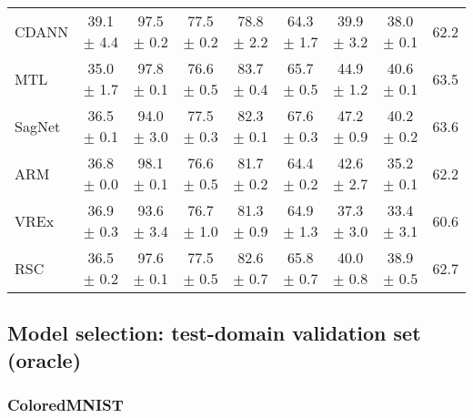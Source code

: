 \documentclass{article}
\begin{document}
\begin{center}
{\begin{tabular}{lcccccccc}
CDANN                     & 39.1 $\pm$ 4.4            & 97.5 $\pm$ 0.2            & 77.5 $\pm$ 0.2            & 78.8 $\pm$ 2.2            & 64.3 $\pm$ 1.7            & 39.9 $\pm$ 3.2            & 38.0 $\pm$ 0.1            & 62.2                      \\
MTL                       & 35.0 $\pm$ 1.7            & 97.8 $\pm$ 0.1            & 76.6 $\pm$ 0.5            & 83.7 $\pm$ 0.4            & 65.7 $\pm$ 0.5            & 44.9 $\pm$ 1.2            & 40.6 $\pm$ 0.1            & 63.5                      \\
SagNet                    & 36.5 $\pm$ 0.1            & 94.0 $\pm$ 3.0            & 77.5 $\pm$ 0.3            & 82.3 $\pm$ 0.1            & 67.6 $\pm$ 0.3            & 47.2 $\pm$ 0.9            & 40.2 $\pm$ 0.2            & 63.6                      \\
ARM                       & 36.8 $\pm$ 0.0            & 98.1 $\pm$ 0.1            & 76.6 $\pm$ 0.5            & 81.7 $\pm$ 0.2            & 64.4 $\pm$ 0.2            & 42.6 $\pm$ 2.7            & 35.2 $\pm$ 0.1            & 62.2                      \\
VREx                      & 36.9 $\pm$ 0.3            & 93.6 $\pm$ 3.4            & 76.7 $\pm$ 1.0            & 81.3 $\pm$ 0.9            & 64.9 $\pm$ 1.3            & 37.3 $\pm$ 3.0            & 33.4 $\pm$ 3.1            & 60.6                      \\
RSC                       & 36.5 $\pm$ 0.2            & 97.6 $\pm$ 0.1            & 77.5 $\pm$ 0.5            & 82.6 $\pm$ 0.7            & 65.8 $\pm$ 0.7            & 40.0 $\pm$ 0.8            & 38.9 $\pm$ 0.5            & 62.7                      \\
\bottomrule
\end{tabular}}
\end{center}

\subsection{Model selection: test-domain validation set (oracle)}

\subsubsection{ColoredMNIST}
\end{document}
